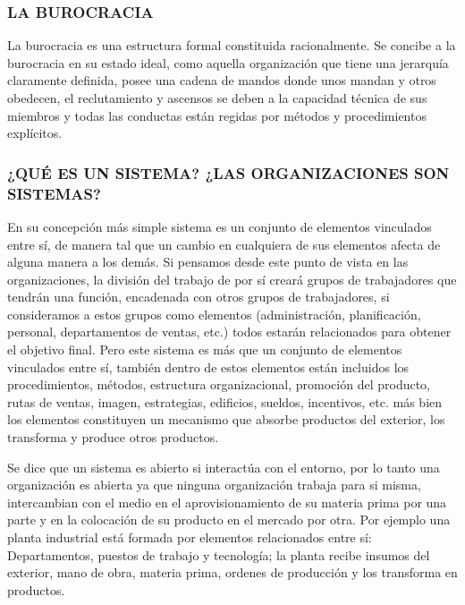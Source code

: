 \begin{center}
\begin{tabular}{|p{}|p{}|}
\end{tabular}
\end{center}

\subsubsection*{LA BUROCRACIA}
La burocracia es una estructura formal constituida racionalmente. Se concibe a la burocracia en su estado ideal, como aquella organización que tiene una jerarquía claramente definida, posee una cadena de mandos donde unos mandan y otros obedecen, el reclutamiento y ascensos se deben a la capacidad técnica de sus miembros y todas las conductas están regidas por métodos y procedimientos explícitos.



\subsubsection*{¿QUÉ ES UN SISTEMA? ¿LAS ORGANIZACIONES SON SISTEMAS?}
En su concepción más simple sistema es un conjunto de elementos vinculados entre sí, de manera tal que un cambio en cualquiera de sus elementos afecta de alguna manera a los demás. Si pensamos desde este punto de vista en las organizaciones, la división del trabajo de por sí creará grupos de trabajadores que tendrán una función, encadenada con otros grupos de trabajadores, si consideramos a estos grupos como elementos (administración, planificación, personal, departamentos de ventas, etc.) todos estarán relacionados para obtener el objetivo final. Pero este sistema es más que un conjunto de elementos vinculados entre sí, también dentro de estos elementos están incluidos los procedimientos, métodos, estructura organizacional, promoción del producto, rutas de ventas, imagen, estrategias, edificios, sueldos, incentivos, etc. más bien los elementos constituyen un mecanismo que absorbe productos del exterior, los transforma y produce otros productos.

Se dice que un sistema es abierto si interactúa con el entorno, por lo tanto una organización es abierta ya que ninguna organización trabaja para si misma, intercambian con el medio en el aprovisionamiento de su materia prima por una parte y en la colocación de su producto en el mercado por otra. Por ejemplo una planta industrial está formada por elementos relacionados entre sí: Departamentos, puestos de trabajo y tecnología; la planta recibe insumos del exterior, mano de obra, materia prima, ordenes de producción y los transforma en productos.

